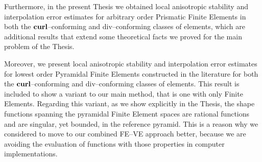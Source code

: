 \documentclass[12pt,a4paper,openany,oneside]{book}
\begin{document}
Furthermore, in the present Thesis we obtained
local anisotropic stability
and interpolation error estimates for arbitrary order Prismatic
Finite Elements in both
the $\textbf{curl}$--conforming and div--conforming classes of elements, which are 
additional results that extend some theoretical facts we proved for
the main problem of the Thesis.

Moreover, we present local anisotropic stability
and interpolation error estimates for lowest order Pyramidal
Finite Elements constructed in the literature for both
the $\textbf{curl}$--conforming and div--conforming classes of elements. This result
is included to show a variant to our main method, that is one 
with only Finite Elements. Regarding this variant, as we show
explicitly in the Thesis, the shape functions 
spanning the pyramidal Finite Element spaces are rational functions and are 
singular, yet bounded,
in the reference pyramid. This is a reason why we considered to move
to our combined FE--VE approach better, because we are avoiding the evaluation
of functions with those properties in computer implementations. 


\tableofcontents{}












	
\end{document}
